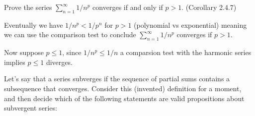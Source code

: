 \begin{solution}
\end{solution}

\begin{exercise}
  Prove the series $\sum_{n=1}^{\infty} 1 / n^{p}$ converges if and only if $p>1$. (Corollary 2.4.7)
\end{exercise}

\begin{solution}
  Eventually we have $1/n^p < 1/p^n$ for $p > 1$ (polynomial vs exponential) meaning we can use the comparison test to conclude $\sum_{n=1}^\infty 1/n^p$ converges if $p > 1$.

  Now suppose $p \le 1$, since $1/n^p \le 1/n$ a comparsion test with the harmonic series implies $p \le 1$ diverges.
\end{solution}

\begin{exercise}
  Let's say that a series subverges if the sequence of partial sums contains a subsequence that converges. Consider this (invented) definition for a moment, and then decide which of the following statements are valid propositions about subvergent series:
\end{exercise}

\begin{solution}
  \enum{
    \item \TODO
    \item \TODO
    \item \TODO
    \item \TODO
  }
\end{solution}

